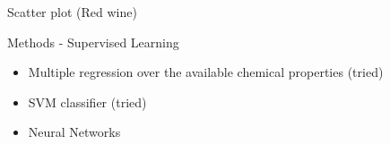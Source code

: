 \documentclass{mine}
\begin{document}
\begin{slide}{Scatter plot (Red wine)}
    \begin{center}
    \end{center}
\end{slide}


\begin{slide}{Methods - Supervised Learning}
    \vspace{3cm}
    \begin{itemize}
        \item{Multiple regression over the available chemical properties (tried)}
        \vspace{1cm}
    \item{SVM classifier (tried)}
        \vspace{1cm}
        \item{Neural Networks}
    \end{itemize}
\end{slide}
\end{document}
